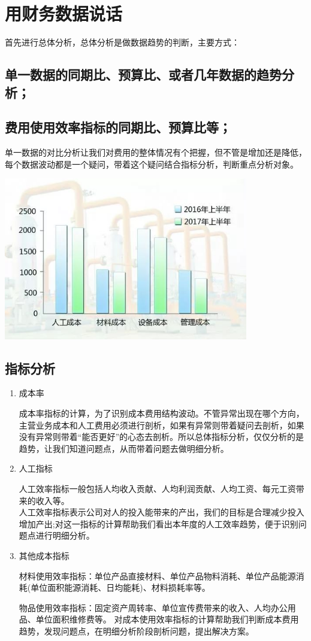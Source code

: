 \documentclass[a4paper]{article}
\begin{document}
\section{用财务数据说话}

首先进行总体分析，总体分析是做数据趋势的判断，主要方式：

\subsection{单一数据的同期比、预算比、或者几年数据的趋势分析；}
\subsection{费用使用效率指标的同期比、预算比等；}
单一数据的对比分析让我们对费用的整体情况有个把握，但不管是增加还是降低，每个数据波动都是一个疑问，带着这个疑问结合指标分析，判断重点分析对象。

\includegraphics[width=0.8\textwidth]{./figure/cost_diagram.jpeg}
\subsection{指标分析}
\begin{enumerate}
	\item 成本率
	
	成本率指标的计算，为了识别成本费用结构波动。不管异常出现在哪个方向，主营业务成本和人工费用必须进行剖析，如果有异常则带着疑问去剖析，如果没有异常则带着“能否更好”的心态去剖析。所以总体指标分析，仅仅分析的是趋势，让我们知道问题点，从而带着问题去做明细分析。
	
	\item 人工指标
	
	人工效率指标一般包括人均收入贡献、人均利润贡献、人均工资、每元工资带来的收入等。\\	
	人工效率指标表示公司对人的投入能带来的产出，我们的目标是合理减少投入增加产出;对这一指标的计算帮助我们看出本年度的人工效率趋势，便于识别问题点进行明细分析。
	
	\item 其他成本指标
	
	材料使用效率指标：单位产品直接材料、单位产品物料消耗、单位产品能源消耗(单位面积能源消耗、日均能耗)、材料损耗率等。
	
	物品使用效率指标：固定资产周转率、单位宣传费带来的收入、人均办公用品、单位面积维修费等。	
	对成本使用效率指标的计算帮助我们判断成本费用趋势，发现问题点，在明细分析阶段剖析问题，提出解决方案。
	
	
\end{enumerate}
\end{document}
